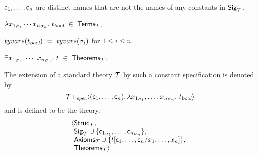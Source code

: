 \begin{myenumerate}

\item
${\sf c}_1,\ldots,{\sf c}_n$ are distinct names that
are not the names of any constants in ${\sf Sig}_{\cal T}$.

\item
$\lambda {x_1}_{\sigma_1}
\cdots {x_n}_{\sigma_n}.\ t_{\textsl{bool}}\ \in\ {\sf Terms}_{\cal T}$.

\item
$tyvars(t_{\ty{bool}})\ =\ tyvars(\sigma_i)$ for $1\leq i\leq n$.

\item
$\equant{{x_1}_{\sigma_1}\ \cdots\ {x_n}_{\sigma_n}}t
\ \in\ {\sf Theorems}_{\cal T}$.

\end{myenumerate}
The extension of a standard theory ${\cal T}$ by such a constant
specification is denoted by
\[
{\cal T}{+_{\it spec}}\langle({\sf c}_1,\ldots,{\sf c}_n),
\lambda {x_1}_{\sigma_1},\ldots,{x_n}_{\sigma_n}.\ t_{\textsl{bool}} \rangle
\]
and is defined to be the theory:
\[
\langle
\begin{array}[t]{@{}l}
{\sf Struc}_{\cal T},\\
{\sf Sig}_{\cal T} \cup
\{{\con{c}_1}_{\sigma_1}, \ldots,
{\con{c}_n}_{\sigma_n}\},\\
{\sf Axioms}_{\cal T}\cup
\{ t[\con{c}_1,\ldots,\con{c}_n/x_1,\ldots,x_n] \},\\
{\sf Theorems}_{\cal T}
\rangle
\end{array}
\]


\medskip

